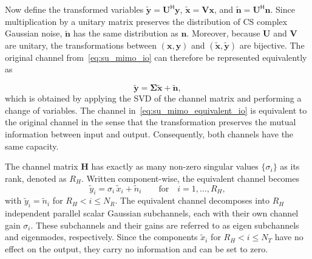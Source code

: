 Now define the transformed variables $\tilde{\mathbf{y}} = \mathbf{U}^{\mathsf{H}} \mathbf{y}$, $\tilde{\mathbf{x}} = \mathbf{V} \mathbf{x}$, and $\tilde{\mathbf{n}} = \mathbf{U}^{\mathsf{H}} \mathbf{n}$.
Since multiplication by a unitary matrix preserves the distribution of \ac{CS} complex Gaussian noise, $\tilde{\mathbf{n}}$ has the same distribution as $\mathbf{n}$. 
Moreover, because $\mathbf{U}$ and $\mathbf{V}$ are unitary, the transformations between $(\mathbf{x},\mathbf{y})$ and $(\tilde{\mathbf{x}},\tilde{\mathbf{y}})$ are bijective. 
The original channel from~\eqref{eq:su_mimo_io} can therefore be represented equivalently as

\begin{equation}
\label{eq:su_mimo_equivalent_io}
    \tilde{\mathbf{y}} = \mathbf{\Sigma}\tilde{\mathbf{x}} + \tilde{\mathbf{n}},
\end{equation}
which is obtained by applying the \ac{SVD} of the channel matrix and performing a change of variables. 
The channel in~\eqref{eq:su_mimo_equivalent_io} is equivalent to the original channel in the sense that the transformation preserves the mutual information between input and output. Consequently, both channels have the same capacity.

The channel matrix $\mathbf{H}$ has exactly as many non-zero singular values $\{\sigma_i\}$ as its rank, denoted as $R_H$.
Written component-wise, the equivalent channel becomes
\begin{equation}
\label{eq:su_mimo_equivalent_io_component_wise}
    \tilde{y}_i = \sigma_i \, \tilde{x}_i + \tilde{n}_i \qquad \text{for} \quad i = 1, \dots, R_H,
\end{equation}
with $\tilde{y}_i = \tilde{n}_i$ for $R_H < i \leq N_R$. 
The equivalent channel decomposes into $R_H$ independent parallel scalar Gaussian subchannels, each with their own channel gain $\sigma_i$. These subchannels and their gains are referred to as eigen subchannels and eigenmodes, respectively.
Since the components $\tilde{x}_i$ for $R_H < i \leq N_T$ have no effect on the output, they carry no information and can be set to zero.

